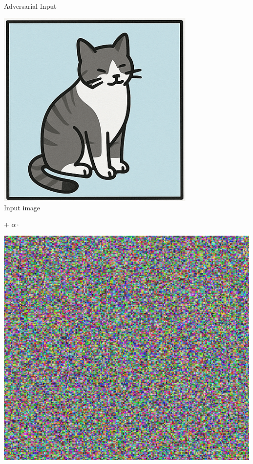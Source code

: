 \begin{frame}{Adversarial Input}
    \begin{minipage}{0.2\linewidth}
        \centering
        \includegraphics[width=\linewidth]{assets/input_cat.png}\\
        Input image
    \end{minipage}\hfill
    + $\alpha \cdot$\hfill
    \begin{minipage}{0.2\linewidth}
        \centering
        \includegraphics[width=\linewidth]{assets/noise.png}\\

\end{minipage}
\end{frame}

